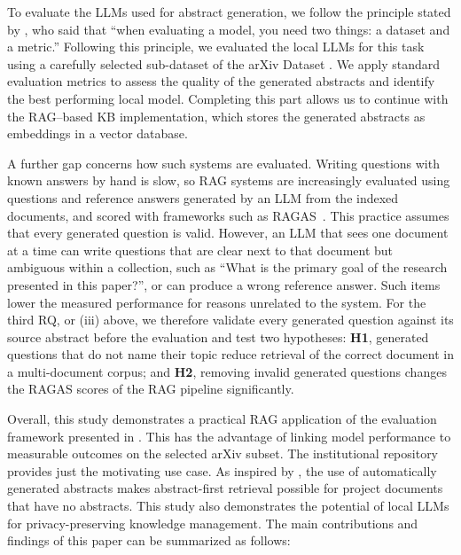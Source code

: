 \documentclass[bdcc,article,submit,pdftex,moreauthors]{Definitions/mdpi}
\newcommand{\commentRed}[1]{\textcolor{red}{#1}}
\begin{document}
To evaluate the LLMs used for abstract generation, we follow the principle stated by \citet{brousseau2025llms}, who said that ``when evaluating a model, you need two things: a dataset and a metric.'' Following this principle, we evaluated the local LLMs for this task using a carefully selected sub-dataset of the arXiv Dataset \citep{arxivdataset2024}. We apply standard evaluation metrics to assess the quality of the generated abstracts and identify the best performing local model. Completing this part allows us to continue with the RAG–based KB implementation, which stores the generated abstracts as embeddings in a vector database.

A further gap concerns how such systems are evaluated. Writing questions with known answers by hand is slow, so RAG systems are increasingly evaluated using questions and reference answers generated by an LLM from the indexed documents, and scored with frameworks such as RAGAS~\cite{es2024ragas}. This practice assumes that every generated question is valid. However, an LLM that sees one document at a time can write questions that are clear next to that document but ambiguous within a collection, such as ``What is the primary goal of the research presented in this paper?'', or can produce a wrong reference answer. Such items lower the measured performance for reasons unrelated to the system. For the third RQ, or (iii) above, we therefore validate every generated question against its source abstract before the evaluation and test two hypotheses: \textbf{H1}, generated questions that do not name their topic reduce retrieval of the correct document in a multi-document corpus; and \textbf{H2}, removing invalid generated questions changes the RAGAS scores of the RAG pipeline significantly.

Overall, this study demonstrates a practical RAG application of the evaluation framework presented in \cite{brousseau2025llms}.
This has the advantage of linking model performance to measurable outcomes on the selected arXiv subset. The institutional repository provides just the motivating use case.
As inspired by \citet{aytar2024retrieval}, the use of automatically generated abstracts makes abstract-first retrieval possible for project documents that have no abstracts. This study also demonstrates the potential of local LLMs for privacy-preserving knowledge management.
The main contributions and findings of this paper can be summarized as follows:
\end{document}

